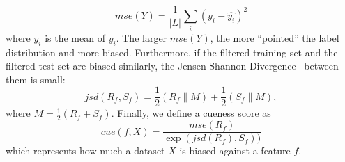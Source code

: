 \begin{equation}
mse(Y) = \frac{1}{|L|} \sum_i (y_i - \hat{y_i})^2
\end{equation}
where $\hat{y_i}$ is the mean of $y_i$. The larger $mse(Y)$, 
the more ``pointed'' the label distribution and more biased. 
Furthermore, if the filtered training set and 
the filtered test set are biased similarly,
the Jensen-Shannon Divergence~\cite{lin1991divergence} between
them is small:
\begin{equation}
jsd(R_f, S_f) = \frac{1}{2}\left (R_f\parallel M  \right )+\frac{1}{2}\left (S_f\parallel M  \right ), 
\end{equation}
where $M= \frac{1}{2}\left (R_f+S_f \right )$. 
Finally, we define a cueness score as
\begin{equation}
cue(f, X) = \frac{mse(R_f)}{\exp(jsd(R_f), S_f))}
\end{equation} 
which represents how much a dataset $X$ is biased against a feature
$f$. 

